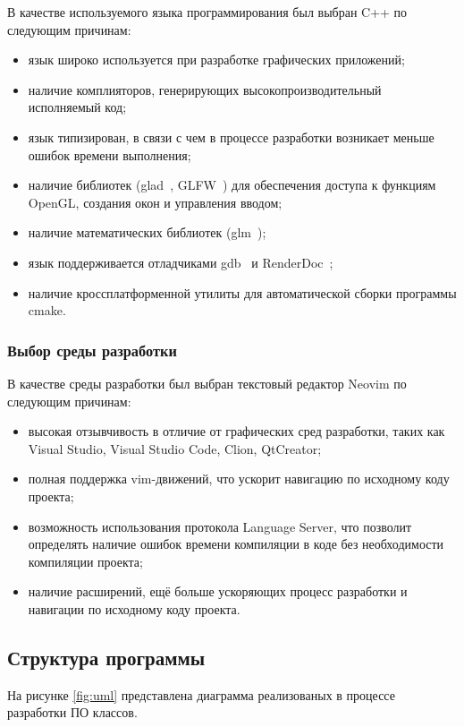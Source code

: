 В качестве используемого языка программирования был выбран C++ по следующим причинам:
\begin{itemize}
    \item язык широко используется при разработке графических приложений;
    \item наличие комплияторов, генерирующих высокопроизводительный исполняемый код;
    \item язык типизирован, в связи с чем в процессе разработки возникает меньше ошибок времени выполнения;
    \item наличие библиотек (glad~\cite{glad}, GLFW~\cite{glfw}) для обеспечения доступа к функциям OpenGL, создания окон и управления вводом;
    \item наличие математических библиотек (glm~\cite{glm});
    \item язык поддерживается отладчиками gdb~\cite{gdb} и RenderDoc~\cite{rd};
    \item наличие кроссплатформенной утилиты для автоматической сборки программы cmake.
\end{itemize}

\subsubsection{Выбор среды разработки}

В качестве среды разработки был выбран текстовый редактор Neovim \cite{nvim} по следующим причинам:
\begin{itemize}
    \item высокая отзывчивость в отличие от графических сред разработки, таких как Visual Studio, Visual Studio Code, Clion, QtCreator;
    \item полная поддержка vim-движений, что ускорит навигацию по исходному коду проекта;
    \item возможность использования протокола Language Server, что позволит определять наличие ошибок времени компиляции в коде без необходимости компиляции проекта;
    \item наличие расширений, ещё больше ускоряющих процесс разработки и навигации по исходному коду проекта.
\end{itemize}

\subsection{Структура программы}

На рисунке \ref{fig:uml} представлена диаграмма реализованых в процессе разработки ПО классов.

